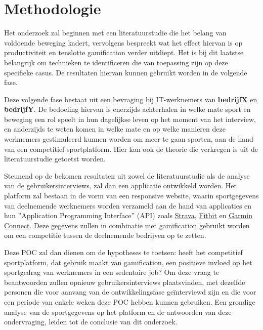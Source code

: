 \section{Methodologie}
\label{sec:methodologie}

Het onderzoek zal beginnen met een literatuurstudie die het belang van voldoende beweging kadert, vervolgens bespreekt wat het effect hiervan is op productiviteit en tenslotte gamification verder uitdiept. Het is bij dit laatstse belangrijk om technieken te identificeren die van toepassing zijn op deze specifieke casus. De resultaten hiervan kunnen gebruikt worden in de volgende fase.

Deze volgende fase bestaat uit een bevraging bij IT-werknemers van \textbf{bedrijfX} en \textbf{bedrijfY}. De bedoeling hiervan is enerzijds achterhalen in \linebreak welke mate sport en beweging een rol speelt in hun dagelijkse leven op het moment van het interview, en anderzijds te weten komen in welke mate en op welke manieren deze werknemers gestimuleerd kunnen worden om meer te gaan sporten, aan de hand van een competitief sportplatform. Hier kan ook de theorie die verkregen is uit de literatuurstudie getoetst worden.

Steunend op de bekomen resultaten uit zowel de literatuurstudie als de analyse van de gebruikersinterviews, zal dan een applicatie ontwikkeld worden. Het platform zal bestaan in de vorm van een responsive website, waarin sportgegevens van deelnemende werknemers worden verzameld aan de hand van applicaties en hun ''Application Programming Interface'' (API) zoals \linebreak \href{https://developers.strava.com/}{Strava}, \href{https://dev.fitbit.com/}{Fitbit} en \href{https://developer.garmin.com/gc-developer-program/overview/}{Garmin Connect}. Deze gegevens zullen in combinatie met gamification gebruikt worden om een competitie tussen de deelnemende bedrijven op te zetten.

Deze POC zal dan dienen om de hypotheses te toetsen: heeft het competitief sportplatform, dat gebruik maakt van gamification, een positieve invloed op het sportgedrag van werknemers in een sedentaire job? Om deze vraag te beantwoorden zullen opnieuw gebruikersinterviews plaatsvinden, met dezelfde personen die voor aanvang van de ontwikkelingsfase geïnterviewd zijn en die voor een periode van enkele weken deze POC hebben kunnen gebruiken. Een grondige analyse van de sportgegevens op het platform en de antwoorden van deze ondervraging, leiden tot de conclusie van dit onderzoek.

